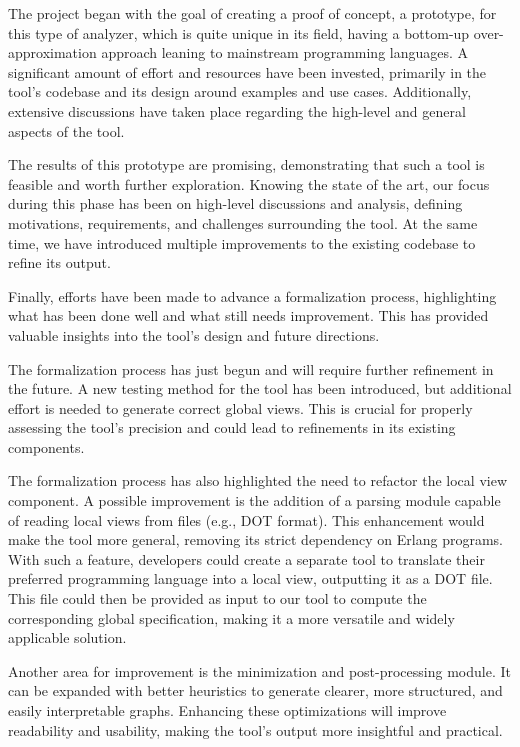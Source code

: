 The project began with the goal of creating a proof of concept, a prototype,  
for this type of analyzer, which is quite unique in its field,
having a bottom-up over-approximation approach leaning to mainstream
programming languages.  
A significant amount of effort and resources have been invested,  
primarily in the tool's codebase and its design around examples and  
use cases. Additionally, extensive discussions have taken place  
regarding the high-level and general aspects of the tool.  

The results of this prototype are promising, demonstrating that such  
a tool is feasible and worth further exploration.  
Knowing the state of the art, our focus during this phase has been on  
high-level discussions and analysis, defining motivations,  
requirements, and challenges surrounding the tool. At the same time,  
we have introduced multiple improvements to the existing codebase to  
refine its output.  

Finally, efforts have been made to advance a formalization process,  
highlighting what has been done well and what still needs  
improvement. This has provided valuable insights into the tool’s  
design and future directions.  

The formalization process has just begun and will require further refinement  
in the future. A new testing method for the tool has been introduced, but  
additional effort is needed to generate correct global views. This is  
crucial for properly assessing the tool's precision and could lead to  
refinements in its existing components.  

The formalization process has also highlighted the need to refactor the  
local view component. A possible improvement is the addition of a parsing  
module capable of reading local views from files (e.g., DOT format).  
This enhancement would make the tool more general, removing its strict  
dependency on Erlang programs. 
With such a feature, developers could create a separate tool to translate  
their preferred programming language into a local view, outputting it  
as a DOT file. This file could then be provided as input to our tool  
to compute the corresponding global specification, making it a more  
versatile and widely applicable solution.  

Another area for improvement is the minimization and post-processing  
module. It can be expanded with better heuristics to generate clearer,  
more structured, and easily interpretable graphs. Enhancing these  
optimizations will improve readability and usability, making the tool’s  
output more insightful and practical.
